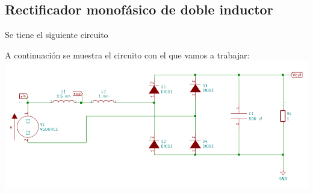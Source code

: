 \documentclass[12pt,a4paper]{article}
\begin{document}
\subsection{Rectificador monofásico de doble inductor}
\begin{flushleft}
Se tiene el siguiente circuito
\end{flushleft}
\begin{flushleft}
A continuación se muestra el circuito con el que vamos a trabajar:\\
\includegraphics[scale=0.8]{imagenes/p3/Circuito3.png} 


\end{flushleft}
\end{document}
